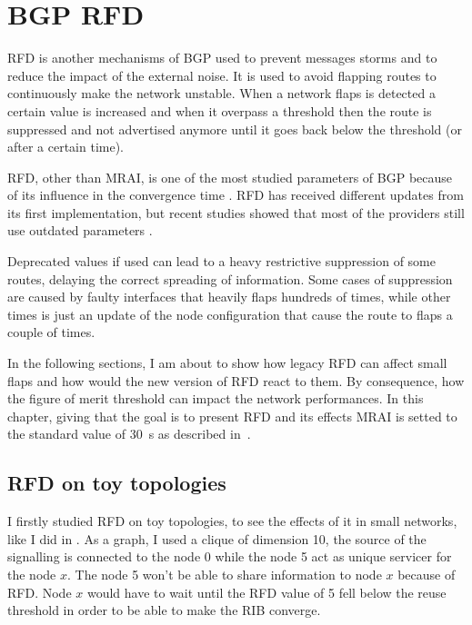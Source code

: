 \chapter{BGP RFD}
\label{cha:bgp_rfd}

\ac{RFD} is another mechanisms of \ac{BGP} used to prevent messages storms
and to reduce the impact of the external noise.
It is used to avoid flapping routes to continuously make the network unstable.
When a network flaps is detected a certain value is increased and when it overpass a threshold
then the route is suppressed and not advertised anymore until it goes back
below the threshold (or after a certain time).

\ac{RFD}, other than \ac{MRAI}, is one of the most studied parameters of \ac{BGP}
because of its influence in the convergence time \cite{mao2002route,pelsser2011route}.
\ac{RFD} has received different updates from its first implementation, but recent
studies showed that most of the providers still use outdated parameters \cite{gray2020bgp}.

Deprecated values if used can lead to a heavy restrictive suppression
of some routes, delaying the correct spreading of information.
Some cases of suppression are caused by faulty interfaces that heavily flaps hundreds of times,
while other times is just an update of the node configuration that
cause the route to flaps a couple of times.

In the following sections, I am about to show how legacy \ac{RFD} can affect
small flaps and how would the new version of \ac{RFD} react to them.
By consequence, how the figure of merit threshold can impact the network
performances.
In this chapter, giving that the goal is to present \ac{RFD} and its effects
\ac{MRAI} is setted to the standard value of \SI{30}{\second} as described
in~\cite{rfc4271}.

\section{RFD on toy topologies}
\label{sec:rfd_toy_topologies}


I firstly studied \ac{RFD} on toy topologies, to see the effects of it in small
networks, like I did in .
As a graph, I used a clique of dimension \num{10}, the source of the signalling
is connected to the node \num{0} while the node \num{5} act as unique servicer
for the node $x$.
The node \num{5} won't be able to share information to node $x$ because of \ac{RFD}.
Node $x$ would have to wait until the \ac{RFD} value of \num{5} fell below
the reuse threshold in order to be able to make the \ac{RIB} converge.

